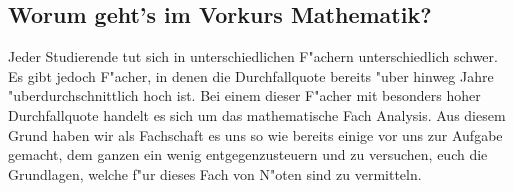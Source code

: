 \subsection{Worum geht's im Vorkurs Mathematik?}
Jeder Studierende tut sich in unterschiedlichen F"achern unterschiedlich schwer.
Es gibt jedoch F"acher, in denen die Durchfallquote bereits "uber hinweg Jahre "uberdurchschnittlich hoch ist.
Bei einem dieser F"acher mit besonders hoher Durchfallquote handelt es sich um das mathematische Fach Analysis.
Aus diesem Grund haben wir als Fachschaft es uns so wie bereits einige vor uns zur Aufgabe gemacht, dem ganzen ein wenig entgegenzusteuern und zu versuchen, euch die Grundlagen, welche f"ur dieses Fach von N"oten sind zu vermitteln.